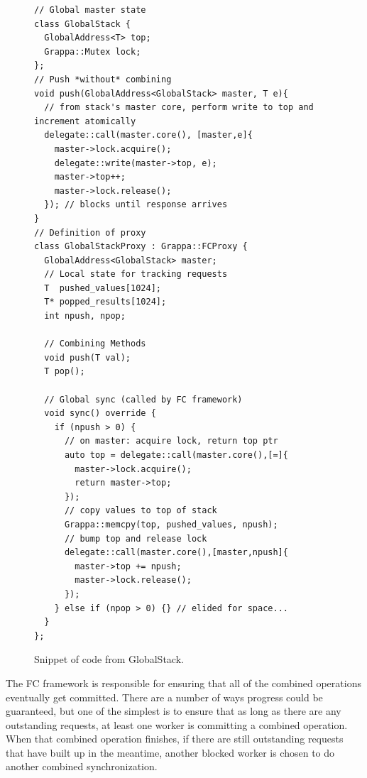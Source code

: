 \begin{figure}[t]
\centering
\begin{lstlisting}[style=grappa]
// Global master state
class GlobalStack {
  GlobalAddress<T> top;
  Grappa::Mutex lock;
};
// Push *without* combining
void push(GlobalAddress<GlobalStack> master, T e){
  // from stack's master core, perform write to top and increment atomically
  delegate::call(master.core(), [master,e]{
    master->lock.acquire();
    delegate::write(master->top, e);
    master->top++;
    master->lock.release();
  }); // blocks until response arrives
}
// Definition of proxy
class GlobalStackProxy : Grappa::FCProxy {
  GlobalAddress<GlobalStack> master;
  // Local state for tracking requests
  T  pushed_values[1024];
  T* popped_results[1024];
  int npush, npop;

  // Combining Methods 
  void push(T val);
  T pop();
  
  // Global sync (called by FC framework)
  void sync() override {
    if (npush > 0) {
      // on master: acquire lock, return top ptr
      auto top = delegate::call(master.core(),[=]{
        master->lock.acquire();
        return master->top;
      });
      // copy values to top of stack
      Grappa::memcpy(top, pushed_values, npush);
      // bump top and release lock
      delegate::call(master.core(),[master,npush]{
        master->top += npush;
        master->lock.release();
      });
    } else if (npop > 0) {} // elided for space...
  }
};
\end{lstlisting}
\caption{Snippet of code from GlobalStack.
}
\label{fig:push}
\end{figure}

The FC framework is responsible for ensuring that all of the combined operations eventually get committed. There are a number of ways progress could be guaranteed, but one of the simplest is to ensure that as long as there are any outstanding requests, at least one worker is committing a combined operation.
When that combined operation finishes, if there are still outstanding requests that have built up in the meantime, another blocked worker is chosen to do another combined synchronization.


